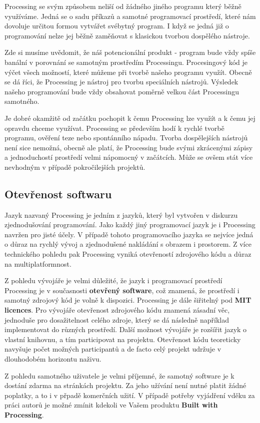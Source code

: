 \documentclass[12pt,twopage]{book}
\newcommand{\pododdil}[1]{\subsection{#1}\label{subsec:#1}}
\newcommand{\slovnik}[1]{\textbf{\gls{#1}}\index{#1}}
\newcommand{\slovnikpl}[1]{\textbf{\glspl{#1}}\index{#1}}
\begin{document}
Processing se svým způsobem neliší od žádného jiného programu který běžně využíváme. Jedná se o sadu příkazů a samotné programovací prostředí, které nám dovoluje určitou formou vytvářet svébytný program. I když se jedná již o programování nelze jej běžně zaměňovat s klasickou tvorbou dospělého nástroje.

Zde si musíme uvědomit, že náš potencionální produkt - program bude vždy spíše banální v porovnání se samotným prostředím Processingu. Procesingový kód je výčet všech možností, které můžeme při tvorbě našeho programu využít. Obecně se dá říci, že Processing je nástroj pro tvorbu speciálních nástrojů. Výsledek našeho programování bude vždy obsahovat poměrně velkou část Processingu samotného.

Je dobré okamžitě od začátku pochopit k čemu Processing lze využít a k čemu jej opravdu chceme využívat. Processing se především hodí k rychlé tvorbě programu, ověření teze nebo spontánního nápadu. Tvorba dospělejších nástrojů není sice nemožná, obecně ale platí, že Processing bude svými zkrácenými zápisy a jednoduchostí prostředí velmi nápomocný v začátcích. Může se ovšem stát více nevhodným v případě pokročilejších projektů. 


\pododdil{Otevřenost softwaru}

Jazyk nazvaný Processing je jedním z jazyků, který byl vytvořen v diskurzu zjednodušování programování. Jako každý jiný programovací jazyk je i Processing navržen pro jisté účely. V případě tohoto programovacího jazyka se nejvíce jedná o důraz na rychlý vývoj a zjednodušené nakládání s obrazem i prostorem. Z více technického pohledu pak Processing vyniká otevřeností zdrojového kódu a důraz na multiplatformnost.

Z pohledu vývojáře je velmi důležité, že jazyk i programovací prostředí Processing je v současnosti \slovnik{otevřený software}, což znamená, že prostředí i samotný zdrojový kód je volně k dispozici. Processing je dále šiřitelný pod \slovnikpl{MIT licence}. Pro vývojáře otevřenost zdrojového kódu znamená zásadní věc, jednoduše pro dosažitelnost celého zdroje, který se dá následně například implementovat do různých prostředí. Další možnost vývojáře je rozšířit jazyk o vlastní knihovnu, a tím participovat na projektu. Otevřenost kódu teoreticky navyšuje počet možných participantů a de facto celý projekt udržuje v dlouhodobém horizontu naživu.

Z pohledu samotného uživatele je velmi příjemné, že samotný software je k dostání zdarma na stránkách projektu. Za jeho užívání není nutné platit žádné poplatky, a to i v přpadě komerčních užití. V případě potřeby vyjádření vděku za práci autorů je možné zmínit kdekoli ve Vašem produktu \slovnik{Built with Processing}.
\end{document}
